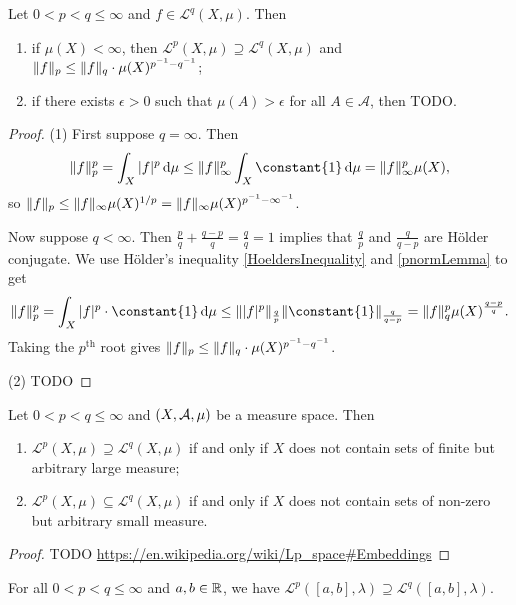 \begin{proposition}
Let $0<p<q \leq \infty$ and $f\in \mathcal{L}^q(X,\mu)$. Then
\begin{enumerate}
\item if $\mu(X)<\infty$, then $\mathcal{L}^p(X,\mu) \supseteq \mathcal{L}^q(X,\mu)$ and $\lVert f\rVert_p \leq \lVert f\rVert_q\cdot\mu(X)^{p^{-1}-q^{-1}}$;
\item if there exists $\epsilon > 0$ such that $\mu(A) > \epsilon$ for all $A\in \mathcal{A}$, then TODO.
\end{enumerate}
\end{proposition}
\begin{proof}
(1) First suppose $q = \infty$. Then
\[ \norm{f}_p^p = \int_X |f|^p\diff\mu \leq \norm{f}_\infty^p\int_X \constant{1}\diff\mu = \norm{f}_\infty^p\mu(X), \]
so $\lVert f\rVert_p \leq \lVert f\rVert_\infty\mu(X)^{1/p} = \lVert f\rVert_\infty\mu(X)^{p^{-1} - \infty^{-1}}$.

Now suppose $q < \infty$. Then $\frac{p}{q} + \frac{q-p}{q} = \frac{q}{q} = 1$ implies that $\frac{q}{p}$ and $\frac{q}{q-p}$ are Hölder conjugate. We use Hölder's inequality \ref{HoeldersInequality} and \ref{pnormLemma} to get
\[ \norm{f}^p_p = \int_X |f|^p \cdot \constant{1}\diff\mu \leq \norm{|f|^p}_{\frac{q}{p}}\norm{\constant{1}}_{\frac{q}{q-p}} = \norm{f}_q^p \mu(X)^{\frac{q-p}{q}}. \]
Taking the $p^\text{th}$ root gives $\lVert f\rVert_p \leq \lVert f\rVert_q\cdot\mu(X)^{p^{-1}-q^{-1}}$.

(2) TODO
\end{proof}


\begin{proposition}
Let $0< p<q \leq \infty$ and $\sSet{X,\mathcal{A},\mu}$ be a measure space. Then
\begin{enumerate}
\item $\mathcal{L}^p(X,\mu) \supseteq \mathcal{L}^q(X,\mu)$ \textup{if and only if} $X$ does not contain sets of finite but arbitrary large measure;
\item $\mathcal{L}^p(X,\mu) \subseteq \mathcal{L}^q(X,\mu)$ \textup{if and only if} $X$ does not contain sets of non-zero but arbitrary small measure.
\end{enumerate}
\end{proposition}
\begin{proof}
TODO \url{https://en.wikipedia.org/wiki/Lp_space#Embeddings}
\end{proof}
\begin{corollary}
For all $0< p<q \leq \infty$ and $a,b\in\mathbb{R}$, we have $\mathcal{L}^p([a,b],\lambda) \supseteq \mathcal{L}^q([a,b],\lambda)$.
\end{corollary}

